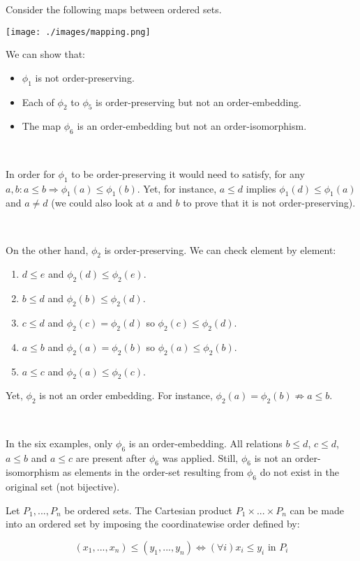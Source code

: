 \begin{example}
	Consider the following maps between ordered sets.
	\begin{center}
		\texttt{[image: ./images/mapping.png]}
	\end{center}

	We can show that:
	\begin{itemize}
		\item $\phi_1$ is not order-preserving.
		\item Each of $\phi_2$ to $\phi_5$ is order-preserving but not an order-embedding.
		\item The map $\phi_6$ is an order-embedding but not an order-isomorphism.
	\end{itemize}

	\

	In order for $\phi_1$ to be order-preserving it would need to satisfy, for any $a,b: a \leq b \Rightarrow \phi_1(a) \leq \phi_1(b)$. Yet, for instance, $a \leq d$ implies $\phi_1(d) \leq \phi_1(a)$ and $a \neq d$ (we could also look at $a$ and $b$ to prove that it is not order-preserving).

	\

	On the other hand, $\phi_2$ is order-preserving. We can check element by element:
	\begin{enumerate}
		\item $d \leq e$ and $\phi_2(d) \leq \phi_2(e)$.
		\item $b \leq d$ and $\phi_2(b) \leq \phi_2(d)$.
		\item $c \leq d$ and $\phi_2(c) = \phi_2(d)$ so $\phi_2(c) \leq \phi_2(d)$.
		\item $a \leq b$ and $\phi_2(a) = \phi_2(b)$ so $\phi_2(a) \leq \phi_2(b)$.
		\item $a \leq c$ and $\phi_2(a) \leq \phi_2(c)$.
	\end{enumerate}
	Yet, $\phi_2$ is not an order embedding. For instance, $\phi_2(a) = \phi_2(b) \not \Rightarrow a \leq b$.

	\

	In the six examples, only $\phi_6$ is an order-embedding. All relations $b \leq d$, $c \leq d$, $a \leq b$ and $a \leq c$ are present after $\phi_6$ was applied. Still, $\phi_6$ is not an order-isomorphism as elements in the order-set resulting from $\phi_6$ do not exist in the original set (not bijective).

\end{example}

\begin{definition}[products]
	Let $P_1, ..., P_n$ be ordered sets. The Cartesian product $P_1 \times ... \times P_n$ can be made into an ordered set by imposing the coordinatewise order defined by:

	$$(x_1, ..., x_n) \leq (y_1, ..., y_n) \Leftrightarrow (\forall i) x_i \leq y_i \text{ in } P_i$$
\end{definition}

